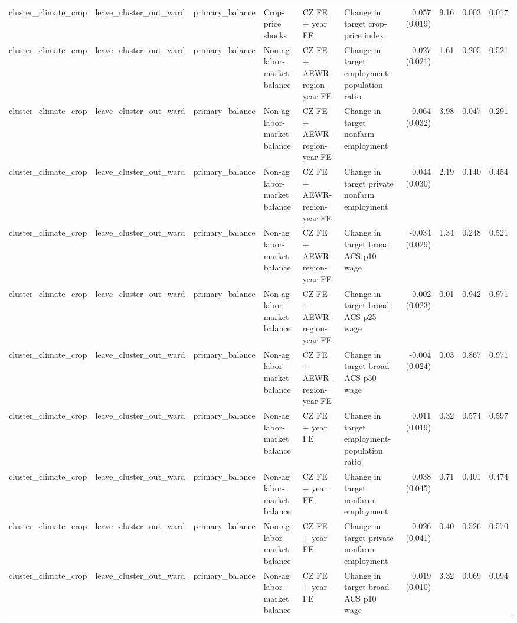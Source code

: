 \begin{tabular}{llllllrrrr}
cluster_climate_crop & leave_cluster_out_ward & primary_balance & Crop-price shocks & CZ FE + year FE & Change in target crop-price index & 0.057 (0.019) & 9.16 & 0.003 & 0.017 \\
cluster_climate_crop & leave_cluster_out_ward & primary_balance & Non-ag labor-market balance & CZ FE + AEWR-region-year FE & Change in target employment-population ratio & 0.027 (0.021) & 1.61 & 0.205 & 0.521 \\
cluster_climate_crop & leave_cluster_out_ward & primary_balance & Non-ag labor-market balance & CZ FE + AEWR-region-year FE & Change in target nonfarm employment & 0.064 (0.032) & 3.98 & 0.047 & 0.291 \\
cluster_climate_crop & leave_cluster_out_ward & primary_balance & Non-ag labor-market balance & CZ FE + AEWR-region-year FE & Change in target private nonfarm employment & 0.044 (0.030) & 2.19 & 0.140 & 0.454 \\
cluster_climate_crop & leave_cluster_out_ward & primary_balance & Non-ag labor-market balance & CZ FE + AEWR-region-year FE & Change in target broad ACS p10 wage & -0.034 (0.029) & 1.34 & 0.248 & 0.521 \\
cluster_climate_crop & leave_cluster_out_ward & primary_balance & Non-ag labor-market balance & CZ FE + AEWR-region-year FE & Change in target broad ACS p25 wage & 0.002 (0.023) & 0.01 & 0.942 & 0.971 \\
cluster_climate_crop & leave_cluster_out_ward & primary_balance & Non-ag labor-market balance & CZ FE + AEWR-region-year FE & Change in target broad ACS p50 wage & -0.004 (0.024) & 0.03 & 0.867 & 0.971 \\
cluster_climate_crop & leave_cluster_out_ward & primary_balance & Non-ag labor-market balance & CZ FE + year FE & Change in target employment-population ratio & 0.011 (0.019) & 0.32 & 0.574 & 0.597 \\
cluster_climate_crop & leave_cluster_out_ward & primary_balance & Non-ag labor-market balance & CZ FE + year FE & Change in target nonfarm employment & 0.038 (0.045) & 0.71 & 0.401 & 0.474 \\
cluster_climate_crop & leave_cluster_out_ward & primary_balance & Non-ag labor-market balance & CZ FE + year FE & Change in target private nonfarm employment & 0.026 (0.041) & 0.40 & 0.526 & 0.570 \\
cluster_climate_crop & leave_cluster_out_ward & primary_balance & Non-ag labor-market balance & CZ FE + year FE & Change in target broad ACS p10 wage & 0.019 (0.010) & 3.32 & 0.069 & 0.094 \\

\end{tabular}
